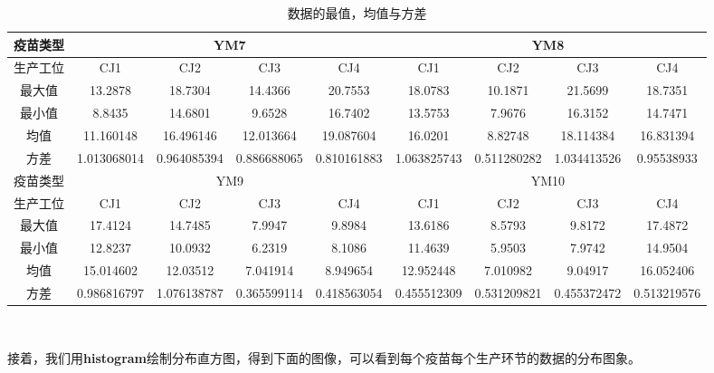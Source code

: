 \documentclass{ctexart}
\begin{document}
\begin{table}[!h]
{\begin{tabular}{|c|c|c|c|c|c|c|c|c|}
        疫苗类型  & \multicolumn{4}{c|}{YM7} & \multicolumn{4}{c|}{YM8} \\ \hline
        生产工位 & CJ1 & CJ2 & CJ3 & CJ4 & CJ1 & CJ2 & CJ3 & CJ4 \\ \hline
        最大值 & 13.2878 & 18.7304 & 14.4366 & 20.7553 & 18.0783 & 10.1871 & 21.5699 & 18.7351 \\ \hline
        最小值 & 8.8435 & 14.6801 & 9.6528 & 16.7402 & 13.5753 & 7.9676 & 16.3152 & 14.7471 \\ \hline
        均值 & 11.160148 & 16.496146 & 12.013664 & 19.087604 & 16.0201 & 8.82748 & 18.114384 & 16.831394 \\ \hline
        方差 & 1.013068014 & 0.964085394 & 0.886688065 & 0.810161883 & 1.063825743 & 0.511280282 & 1.034413526 & 0.95538933 \\ \hline\hline
        疫苗类型  & \multicolumn{4}{c|}{YM9} & \multicolumn{4}{c|}{YM10} \\ \hline
        生产工位 & CJ1 & CJ2 & CJ3 & CJ4 & CJ1 & CJ2 & CJ3 & CJ4 \\ \hline
        最大值 & 17.4124 & 14.7485 & 7.9947 & 9.8984 & 13.6186 & 8.5793 & 9.8172 & 17.4872 \\ \hline
        最小值 & 12.8237 & 10.0932 & 6.2319 & 8.1086 & 11.4639 & 5.9503 & 7.9742 & 14.9504 \\ \hline
        均值 & 15.014602 & 12.03512 & 7.041914 & 8.949654 & 12.952448 & 7.010982 & 9.04917 & 16.052406 \\ \hline
        方差 & 0.986816797 & 1.076138787 & 0.365599114 & 0.418563054 & 0.455512309 & 0.531209821 & 0.455372472 & 0.513219576 \\ \hline\hline
    \end{tabular}
    }
    \\
    \caption{数据的最值，均值与方差}
    \label{表格1}
\end{table}

接着，我们用\textbf{histogram}绘制分布直方图，得到下面的图像，可以看到每个疫苗每个生产环节的数据的分布图象。
\end{document}

